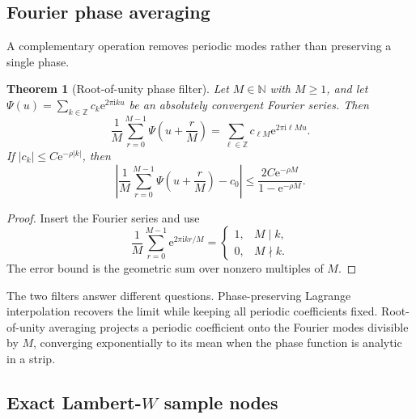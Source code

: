 \documentclass[11pt]{article}
\numberwithin{equation}{section}
\newtheorem{theorem}{Theorem}[section]
\theoremstyle{definition}
\theoremstyle{remark}
\newcommand{\Z}{\mathbb Z}
\newcommand{\N}{\mathbb N}
\newcommand{\e}{\mathrm e}
\newcommand{\ii}{\mathrm i}
\begin{document}
\subsection{Fourier phase averaging}

A complementary operation removes periodic modes rather than preserving a single phase.

\begin{theorem}[Root-of-unity phase filter]
\label{p10:thm:phase-average}
Let $M\in\N$ with $M\ge1$, and let
\(
 \Psi(u)=\sum_{k\in\Z}c_k\e^{2\pi\ii ku}
\)
be an absolutely convergent Fourier series.  Then
\begin{equation}
 \frac1M\sum_{r=0}^{M-1}\Psi\!\left(u+\frac rM\right)
 =\sum_{\ell\in\Z}c_{\ell M}\e^{2\pi\ii\ell Mu}.            \label{p10:eq:phase-average}
\end{equation}
If $|c_k|\le C\e^{-\rho|k|}$, then
\begin{equation}
 \left|
 \frac1M\sum_{r=0}^{M-1}\Psi\!\left(u+\frac rM\right)-c_0
 \right|
 \le\frac{2C\e^{-\rho M}}{1-\e^{-\rho M}}.                 \label{p10:eq:phase-average-error}
\end{equation}
\end{theorem}

\begin{proof}
Insert the Fourier series and use
\[
 \frac1M\sum_{r=0}^{M-1}\e^{2\pi\ii kr/M}
 =\begin{cases}1,&M\mid k,\\0,&M\nmid k.\end{cases}
\]
The error bound is the geometric sum over nonzero multiples of $M$.
\end{proof}

The two filters answer different questions.  Phase-preserving Lagrange interpolation recovers
the limit while keeping all periodic coefficients fixed.  Root-of-unity averaging projects a
periodic coefficient onto the Fourier modes divisible by $M$, converging exponentially to its
mean when the phase function is analytic in a strip.

\subsection{Exact Lambert-\texorpdfstring{$W$}{W} sample nodes}
\end{document}
